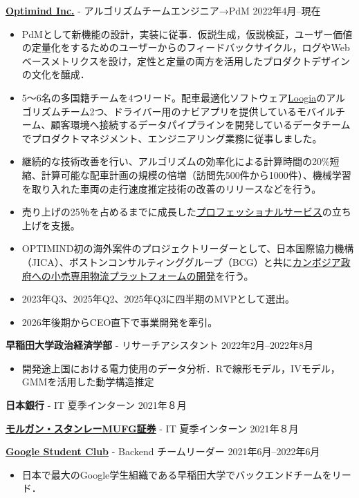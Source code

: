 \documentclass[uplatex,dvipdfmx,a4paper,11pt]{jsarticle}
\begin{document}
{\bf \href{https://www.optimind.tech/}{Optimind Inc.}} { - アルゴリズムチームエンジニア→PdM} \hfill {2022年4月--現在} 
\begin{itemize}
\item PdMとして新機能の設計，実装に従事．仮説生成，仮説検証，ユーザー価値の定量化をするためのユーザーからのフィードバックサイクル，ログやWebベースメトリクスを設け，定性と定量の両方を活用したプロダクトデザインの文化を醸成．
\item 5〜6名の多国籍チームを4つリード。配車最適化ソフトウェア\href{https://loogia.jp/}{Loogia}のアルゴリズムチーム2つ、ドライバー用のナビアプリを提供しているモバイルチーム、顧客環境へ接続するデータパイプラインを開発しているデータチームでプロダクトマネジメント、エンジニアリング業務に従事しました。
\item 継続的な技術改善を行い、アルゴリズムの効率化による計算時間の20\%短縮、計算可能な配車計画の規模の倍増（訪問先500件から1000件）、機械学習を取り入れた車両の走行速度推定技術の改善のリリースなどを行う。
\item 売り上げの25％を占めるまでに成長した\href{https://loogia.jp/consulting/}{プロフェッショナルサービス}の立ち上げを支援。
\item OPTIMIND初の海外案件のプロジェクトリーダーとして、日本国際協力機構（JICA）、ボストンコンサルティンググループ（BCG）と共に\href{https://www.jica.go.jp/english/about/dx/project/detail/1569316_68029.html}{カンボジア政府への小売専用物流プラットフォームの開発}を行う。
\item 2023年Q3、2025年Q2、2025年Q3に四半期のMVPとして選出。
\item 2026年後期からCEO直下で事業開発を牽引。
\end{itemize}

{ \bf\textcolor{blue(pigment)}{早稲田大学政治経済学部}} { - リサーチアシスタント} \hfill {2022年2月--2022年8月} 
\begin{itemize}
\item 開発途上国における電力使用のデータ分析．Rで線形モデル，IVモデル，GMMを活用した動学構造推定
\end{itemize}

{\bf\textcolor{blue(pigment)}{日本銀行}}{ - IT 夏季インターン} \hfill { 2021年８月} 

{\bf \href{https://www.morganstanley.co.jp/ja}{モルガン・スタンレーMUFG証券}}{ - IT 夏季インターン} \hfill {2021年８月} 

{ \bf\href{https://gdsc.community.dev/waseda-university/}{Google Student Club}} { - Backend チームリーダー} \hfill {2021年6月--2022年6月} 
\begin{itemize}
\item 日本で最大のGoogle学生組織である早稲田大学でバックエンドチームをリード．%
\end{itemize}
\end{document}
